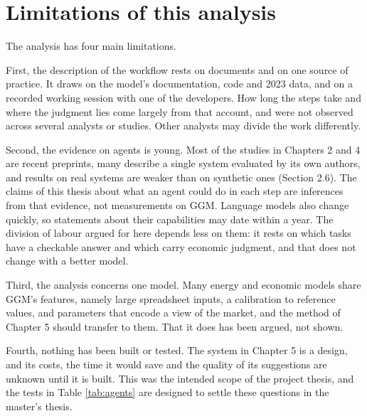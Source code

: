 \section{Limitations of this analysis}

The analysis has four main limitations.

First, the description of the workflow rests on documents and on one source of practice.
It draws on the model's documentation, code and 2023 data, and on a recorded working session with one of the developers.
How long the steps take and where the judgment lies come largely from that account, and were not observed across several analysts or studies.
Other analysts may divide the work differently.

Second, the evidence on agents is young.
Most of the studies in Chapters 2 and 4 are recent preprints, many describe a single system evaluated by its own authors, and results on real systems are weaker than on synthetic ones (Section 2.6).
The claims of this thesis about what an agent could do in each step are inferences from that evidence, not measurements on GGM.
Language models also change quickly, so statements about their capabilities may date within a year.
The division of labour argued for here depends less on them: it rests on which tasks have a checkable answer and which carry economic judgment, and that does not change with a better model.

Third, the analysis concerns one model.
Many energy and economic models share GGM's features, namely large spreadsheet inputs, a calibration to reference values, and parameters that encode a view of the market, and the method of Chapter 5 should transfer to them.
That it does has been argued, not shown.

Fourth, nothing has been built or tested.
The system in Chapter 5 is a design, and its costs, the time it would save and the quality of its suggestions are unknown until it is built.
This was the intended scope of the project thesis, and the tests in Table \ref{tab:agents} are designed to settle these questions in the master's thesis.
